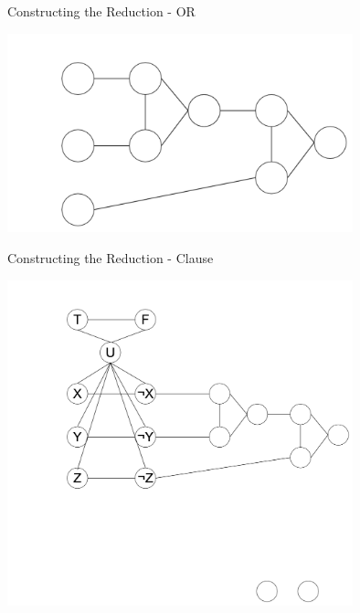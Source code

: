 \documentclass[bigger]{beamer}
\begin{document}
\begin{frame}[label=sec-11]{Constructing the Reduction - OR}
\begin{center}
\includegraphics[width=10cm]{Or2.png}
\end{center}
\end{frame}

\begin{frame}[label=sec-12]{Constructing the Reduction - Clause}
\begin{center}
\includegraphics[width=10cm]{Comb1.png}
\end{center}
\end{frame}
\end{document}
